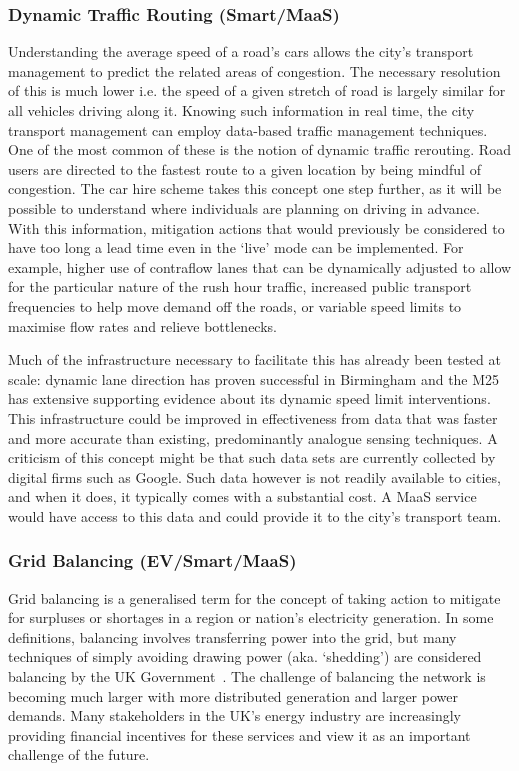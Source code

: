 \documentclass[journal]{IEEEtran}
\begin{document}
\subsubsection{Dynamic Traffic Routing (Smart/MaaS)} 

Understanding the average speed of a road's cars allows the city's
transport management to predict the related areas of congestion. The
necessary resolution of this is much lower i.e. the speed of a given
stretch of road is largely similar for all vehicles driving along
it. Knowing such information in real time, the city transport
management can employ data-based traffic management techniques. One of
the most common of these is the notion of dynamic traffic
rerouting. Road users are directed to the fastest route to a given
location by being mindful of congestion. The car hire scheme takes
this concept one step further, as it will be possible to understand
where individuals are planning on driving in advance. With this
information, mitigation actions that would previously be considered to
have too long a lead time even in the `live' mode can be
implemented. For example, higher use of contraflow lanes that can be
dynamically adjusted to allow for the particular nature of the rush
hour traffic, increased public transport frequencies to help move
demand off the roads, or variable speed limits to maximise flow rates
and relieve bottlenecks.

Much of the infrastructure necessary to facilitate this has already
been tested at scale: dynamic lane direction has proven successful in
Birmingham and the M25 has extensive supporting evidence about its
dynamic speed limit interventions. This infrastructure could be
improved in effectiveness from data that was faster and more accurate
than existing, predominantly analogue sensing techniques.  A criticism
of this concept might be that such data sets are currently collected
by digital firms such as Google. Such data however is not readily
available to cities, and when it does, it typically comes with a
substantial cost. A MaaS service would have access to this data
and could provide it to the city's transport team.


\subsubsection{Grid Balancing (EV/Smart/MaaS)} 

Grid balancing is a generalised term for the concept of taking action
to mitigate for surpluses or shortages in a region or nation’s
electricity generation. In some definitions, balancing involves
transferring power into the grid, but many techniques of simply
avoiding drawing power (aka. `shedding') are considered balancing by
the UK Government~\cite{decc:2014}. The challenge of balancing the
network is becoming much larger with more distributed generation and
larger power demands. Many stakeholders in the UK's energy industry
are increasingly providing financial incentives for these services and
view it as an important challenge of the future.
\end{document}
